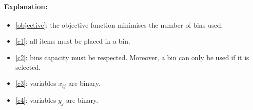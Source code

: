 \documentclass[12pt,a4paper]{article}
\begin{document}
\paragraph{Explanation:}

\begin{itemize}
\item[] \eqref{objective}: the objective function minimises the number of bins used.
\item[] \eqref{c1}: all items must be placed in a bin.
\item[] \eqref{c2}: bins capacity must be respected. Moreover, a bin can only be used if it is selected.
\item[] \eqref{c3}: variables $x_{ij}$ are binary. 
\item[] \eqref{c4}: variables $y_{j}$ are binary. 
\end{itemize}
\end{document}
